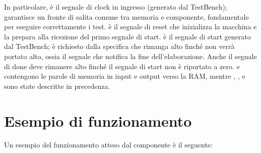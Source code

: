 In particolare,  è il segnale di clock in ingresso (generato dal TestBench); garantisce un fronte di salita comune tra memoria e componente, fondamentale per eseguire correttamente i test.  è il segnale di reset che inizializza la macchina e la prepara alla ricezione del primo segnale di start.  è il segnale di start generato dal TestBench; è richiesto dalla specifica che  rimanga alto finché  non verrà portato alto, ossia il segnale che notifica la fine dell’elaborazione. Anche il segnale di done deve rimanere alto finché il segnale di start non è riportato a zero.  e  contengono le parole di memoria in input e output verso la RAM, mentre , , e  sono state descritte in precedenza.


\section{Esempio di funzionamento}
Un esempio del funzionamento atteso dal componente è il seguente:

